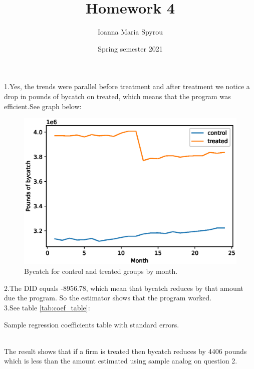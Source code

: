\documentclass{article}
\title{Homework 4}
\author{Ioanna Maria Spyrou}
\date{Spring semester 2021}
\begin{document}
  
\maketitle


1.Yes, the trends were parallel before treatment and after treatment we notice a drop in pounds of bycatch on treated, which means that the program was efficient.See graph below:
\\
\begin{figure}[ht]
    \centering
    \includegraphics[scale = 0.7]{graph.eps}
    \caption{Bycatch for control and treated groups by month.}
    \label{fig:samplebars}
\end{figure}

2.The DID equals -8956.78, which mean that bycatch reduces by that amount due the program. So the estimator shows that the program worked.
\\
3.See table \ref{tab:coef_table}:

\begin{table}[ht]
    \centering
    
    \caption{Sample regression coefficients table with standard errors.}
    \label{tab:coef_table}
\end{table}
\\ 
The result shows that if a firm is treated then bycatch reduces by 4406 pounds which is less than the amount estimated using sample analog on question 2.
\end{document}
